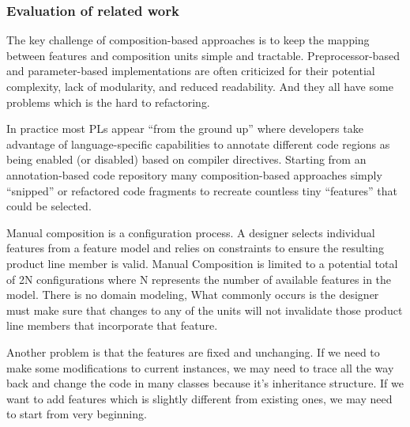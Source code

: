 \subsubsection{Evaluation of related work}

The key challenge of composition-based approaches is to keep the mapping between features and composition units
simple and tractable. Preprocessor-based and parameter-based implementations are often criticized for their
potential complexity, lack of modularity, and reduced readability. And they all have some problems which is the
hard to refactoring.

In practice most PLs appear “from the ground up” where developers take advantage of language-specific capabilities
 to annotate different code regions as being enabled (or disabled) based on compiler directives. Starting from an
 annotation-based code repository many composition-based approaches simply “snipped” or refactored code fragments
 to recreate countless tiny “features” that could be selected.

Manual composition is a configuration process. A designer selects individual features from a feature model and
relies on constraints to ensure the resulting product line member is valid. Manual Composition is limited to a
potential total of 2N configurations where N represents the number of available features in the model. There is no
 domain modeling, What commonly occurs is the designer must make sure that changes to any of the units will not invalidate those product
 line members that incorporate that feature.

 Another problem is that the features are fixed and unchanging. If we need to make some modifications to current
 instances, we may need to trace all the way back and change the code in many classes because it’s inheritance
 structure. If we want to add features which is slightly different from existing ones, we may need to start from
 very beginning.
